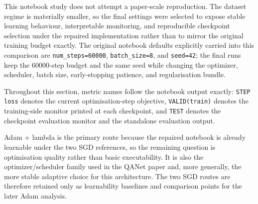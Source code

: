 \documentclass[10pt]{article}
\begin{document}
This notebook study does not attempt a paper-scale reproduction. The dataset regime is materially smaller, so the final settings were selected to expose stable learning behaviour, interpretable monitoring, and reproducible checkpoint selection under the repaired implementation rather than to mirror the original training budget exactly. The original notebook defaults explicitly carried into this comparison are \texttt{num\_steps=60000}, \texttt{batch\_size=8}, and \texttt{seed=42}; the final runs keep the 60000-step budget and the same seed while changing the optimizer, scheduler, batch size, early-stopping patience, and regularisation bundle.

Throughout this section, metric names follow the notebook output exactly: \texttt{STEP loss} denotes the current optimisation-step objective, \texttt{VALID(train)} denotes the training-side monitor printed at each checkpoint, and \texttt{TEST} denotes the checkpoint evaluation monitor and the standalone evaluation output.

Adam + lambda is the primary route because the repaired notebook is already learnable under the two SGD references, so the remaining question is optimisation quality rather than basic executability. It is also the optimizer/scheduler family used in the QANet paper and, more generally, the more stable adaptive choice for this architecture. The two SGD routes are therefore retained only as learnability baselines and comparison points for the later Adam analysis.
\end{document}
